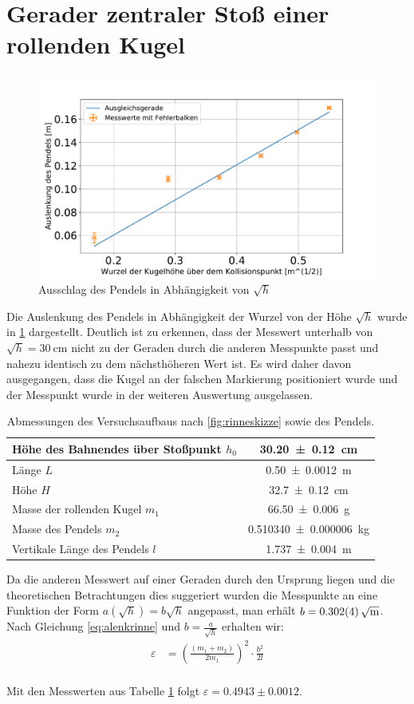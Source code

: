 \section[Rollende Kugel]{Gerader zentraler Stoß einer rollenden Kugel}\label{kap:roll}



\begin{figure}[h!]
	\centering
	\includegraphics[width=0.7\linewidth]{res/Rinne}
	\caption{Ausschlag des Pendels in Abhängigkeit von $\sqrt{h}$}
	\label{fig:rinne}
\end{figure}

Die Auslenkung des Pendels in Abhängigkeit der Wurzel von der Höhe $\sqrt{h}$ wurde in \cref{fig:rinne} dargestellt. Deutlich ist zu erkennen, dass der Messwert unterhalb von $\sqrt{h}=\SI{30}{\centi\metre}$ nicht zu der Geraden durch die anderen Messpunkte passt und nahezu identisch zu dem nächsthöheren Wert ist. Es wird daher davon ausgegangen, dass die Kugel an der falschen Markierung positioniert wurde und der Messpunkt wurde in der weiteren Auswertung ausgelassen.
\begin{table}
	\caption{Abmessungen des Versuchsaufbaus nach \cref{fig:rinneskizze} sowie des Pendels.}

\begin{tabular}{|l|c|}
	\hline 
	Höhe des Bahnendes über Stoßpunkt $h_0$ & \SI{30.20+-0.12}{cm}  \\ 
	\hline 
	Länge $L$ & \SI{0.50+-0.0012}{\metre}  \\ 
		\hline 
	Höhe $H$&  \SI{32.7+-0.12}{\centi \meter}\\ 
	\hline
	Masse der rollenden Kugel $m_1$& \SI{66.50 \pm 0,006}{\gram}  \\ 
	\hline 
	Masse des Pendels $m_2$ & \SI{0.510340+-0.000006}{\kilogram} \\  
	\hline
	Vertikale Länge des Pendels $l$ & \SI{1.737+-0.004}{\metre}  \\ 
	\hline 
\end{tabular} 
\label{tab:messwrinne}
\end{table}
Da die anderen Messwert auf einer Geraden durch den Ursprung liegen und die theoretischen Betrachtungen dies suggeriert wurden die Messpunkte an eine Funktion der Form $a(\sqrt{h})=b \sqrt{h}$ angepasst, man erhält $b=\SI{0.302+-0.004}{\sqrt{\metre}}$. Nach Gleichung \ref{eq:alenkrinne} und $b=\frac{a}{\sqrt{h}}$ erhalten wir:
\begin{align}
\varepsilon&=\left( \frac{(m_1+m_2)}{2m_1} \right) ^2 \cdot \frac{b^2}{2l}\\
\end{align}

Mit den Messwerten aus Tabelle \ref{tab:messwrinne} folgt $\varepsilon = 0.4943 \pm 0.0012$.














